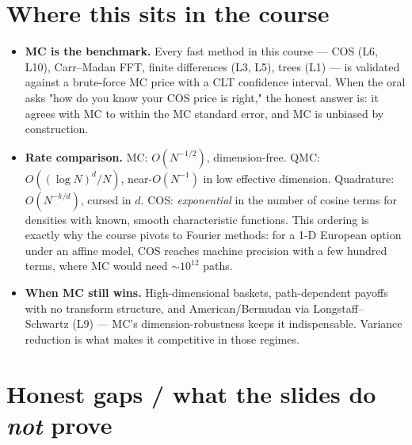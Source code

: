 \documentclass[11pt]{article}
\begin{document}
\section{Where this sits in the course}

\begin{itemize}[leftmargin=2em]
\item \textbf{MC is the benchmark.} Every fast method in this course --- COS (L6, L10),
Carr--Madan FFT, finite differences (L3, L5), trees (L1) --- is validated against a
brute-force MC price with a CLT confidence interval. When the oral asks "how do you know
your COS price is right," the honest answer is: it agrees with MC to within the MC
standard error, and MC is unbiased by construction.
\item \textbf{Rate comparison.} MC: $O(N^{-1/2})$, dimension-free. QMC:
$O((\log N)^d/N)$, near-$O(N^{-1})$ in low effective dimension. Quadrature: $O(N^{-k/d})$,
cursed in $d$. COS: \emph{exponential} in the number of cosine terms for densities with
known, smooth characteristic functions. This ordering is exactly why the course pivots
to Fourier methods: for a 1-D European option under an affine model, COS reaches machine
precision with a few hundred terms, where MC would need $\sim10^{12}$ paths.
\item \textbf{When MC still wins.} High-dimensional baskets, path-dependent payoffs with
no transform structure, and American/Bermudan via Longstaff--Schwartz (L9) --- MC's
dimension-robustness keeps it indispensable. Variance reduction is what makes it
competitive in those regimes.
\end{itemize}

\section*{Honest gaps / what the slides do \emph{not} prove}
\end{document}
